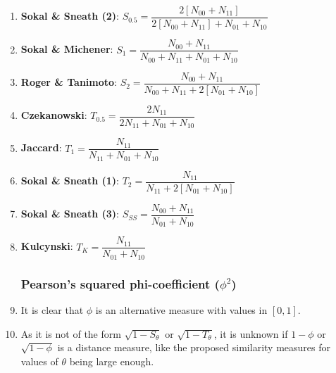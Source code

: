\begin{enumerate}
    \item \textbf{Sokal \& Sneath (2)}: $ S_{0.5} = \dfrac{2[N_{00} + N_{11}]}{2[N_{00} + N_{11}] + N_{01} + N_{10}} $
    \hfill \cite{statistics/book/Statistics-for-Data-Scientists/Maurits-Kaptein}

    \item \textbf{Sokal \& Michener}: $ S_1 = \dfrac{N_{00} + N_{11}}{N_{00} + N_{11} + N_{01} + N_{10}} $
    \hfill \cite{statistics/book/Statistics-for-Data-Scientists/Maurits-Kaptein}

    \item \textbf{Roger \& Tanimoto}: $ S_2  = \dfrac{N_{00} + N_{11}}{N_{00} + N_{11} + 2[N_{01} + N_{10}]} $
    \hfill \cite{statistics/book/Statistics-for-Data-Scientists/Maurits-Kaptein}

    \item \textbf{Czekanowski}: $ T_{0.5} = \dfrac{2N_{11}}{2N_{11} + N_{01} + N_{10}} $
    \hfill \cite{statistics/book/Statistics-for-Data-Scientists/Maurits-Kaptein}

    \item \textbf{Jaccard}: $  T_1 = \dfrac{N_{11}}{N_{11} + N_{01} + N_{10}} $
    \hfill \cite{statistics/book/Statistics-for-Data-Scientists/Maurits-Kaptein}

    \item \textbf{Sokal \& Sneath (1)}: $ T_2 = \dfrac{N_{11}}{N_{11} + 2[N_{01} + N_{10}]} $
    \hfill \cite{statistics/book/Statistics-for-Data-Scientists/Maurits-Kaptein}

    \item \textbf{Sokal \& Sneath (3)}: $ S_{SS} = \dfrac{N_{00} + N_{11}}{N_{01} + N_{10}} $
    \hfill \cite{statistics/book/Statistics-for-Data-Scientists/Maurits-Kaptein}

    \item \textbf{Kulcynski}: $ T_K = \dfrac{N_{11}}{N_{01} + N_{10}} $
    \hfill \cite{statistics/book/Statistics-for-Data-Scientists/Maurits-Kaptein}

\subsubsection{Pearson’s squared phi-coefficient ($\phi^2$)}

    \item It is clear that $\phi$ is an alternative measure with values in $[0, 1]$.
    \hfill \cite{statistics/book/Statistics-for-Data-Scientists/Maurits-Kaptein}

    \item As it is not of the form $\sqrt{1 - S_\theta}$ or $\sqrt{1 - T_\theta}$, it is unknown if $1 - \phi$ or $\sqrt{1 - \phi}$ is a distance measure, like the proposed similarity measures for values of $\theta$ being large enough.
    \hfill \cite{statistics/book/Statistics-for-Data-Scientists/Maurits-Kaptein}


\end{enumerate}
